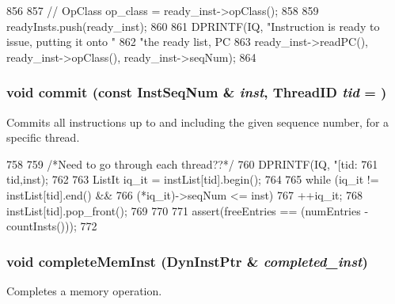 \begin{DoxyCode}
856 {
857 //    OpClass op_class = ready_inst->opClass();
858 
859     readyInsts.push(ready_inst);
860 
861     DPRINTF(IQ, "Instruction is ready to issue, putting it onto "
862             "the ready list, PC %
863             ready_inst->readPC(), ready_inst->opClass(), ready_inst->seqNum);
864 }
\end{DoxyCode}
\hypertarget{classInstQueue_a04f8d2acf3cd0b90a1efc69b528f91bc}{
\subsubsection[{commit}]{\setlength{\rightskip}{0pt plus 5cm}void commit (const {\bf InstSeqNum} \& {\em inst}, \/  {\bf ThreadID} {\em tid} = {})}}
\label{classInstQueue_a04f8d2acf3cd0b90a1efc69b528f91bc}
Commits all instructions up to and including the given sequence number, for a specific thread. 


\begin{DoxyCode}
758 {
759     /*Need to go through each thread??*/
760     DPRINTF(IQ, "[tid:%
761             tid,inst);
762 
763     ListIt iq_it = instList[tid].begin();
764 
765     while (iq_it != instList[tid].end() &&
766            (*iq_it)->seqNum <= inst) {
767         ++iq_it;
768         instList[tid].pop_front();
769     }
770 
771     assert(freeEntries == (numEntries - countInsts()));
772 }
\end{DoxyCode}
\hypertarget{classInstQueue_aad2715729f71f220e9cf9b99515384ca}{
\subsubsection[{completeMemInst}]{\setlength{\rightskip}{0pt plus 5cm}void completeMemInst ({\bf DynInstPtr} \& {\em completed\_\-inst})}}
\label{classInstQueue_aad2715729f71f220e9cf9b99515384ca}
Completes a memory operation. 


